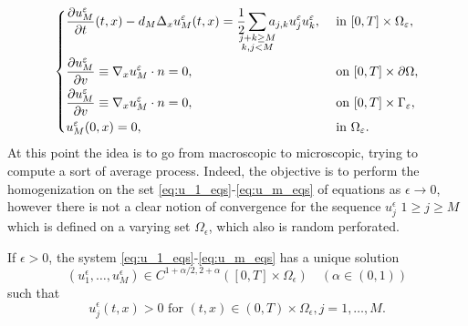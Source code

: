 \begin{equation}
    \begin{dcases}
        \frac{\partial u_{M}^{\epsilon}}{\partial t}(t, x)-d_{M} \Delta_{x} u_{M}^{\epsilon}(t, x)= \frac{1}{2} \sum_{\mathclap{\substack{j+k\geq M\\k,j<M}}} a_{j, k} u_{j}^{\epsilon} u_{k}^{\epsilon}, & \text { in }[0, T] \times \Omega_{\epsilon},\\
        \frac{\partial u_{M}^{\epsilon}}{\partial v} \equiv \nabla_{x} u_{M}^{\epsilon} \cdot n=0,  & \text { on }[0, T]\times\partial\Omega,
        \\
        \frac{\partial u_{M}^{\epsilon}}{\partial v} \equiv \nabla_{x} u_{M}^{\epsilon} \cdot n=0, & \text { on }[0, T]\times\Gamma_{\epsilon},\\ 
        u_{M}^{\epsilon}(0, x)=0, & \text{ in }\Omega_{\epsilon}.
    \end{dcases}
    \label{eq:u_M_eqs}
\end{equation}
At this point the idea is to go from macroscopic to microscopic, trying to compute a sort of average process. Indeed, the objective is to perform the homogenization on the set \eqref{eq:u_1_eqs}-\eqref{eq:u_m_eqs} of equations as $\epsilon \rightarrow 0$, however there is not a clear notion of convergence for the sequence $u_j^{\epsilon}$ $1\geq j \geq M$ which is defined on a varying set $\Omega_{\epsilon}$, which also is random perforated.

\begin{theorem} 
    If $\epsilon>0$, the system \eqref{eq:u_1_eqs}-\eqref{eq:u_m_eqs} has a unique solution
    $$
    \left(u_{1}^{\epsilon}, \ldots, u_{M}^{\epsilon}\right) \in C^{1+\alpha / 2,2+\alpha}\left([0, T] \times \Omega_{\epsilon}\right) \quad(\alpha \in(0,1))
    $$
    such that
    $$
    u_{j}^{\epsilon}(t, x)>0 \text { for }(t, x) \in(0, T) \times \Omega_{\epsilon}, j=1, \ldots, M .
    $$
    \label{thm:3.1}
\end{theorem}
